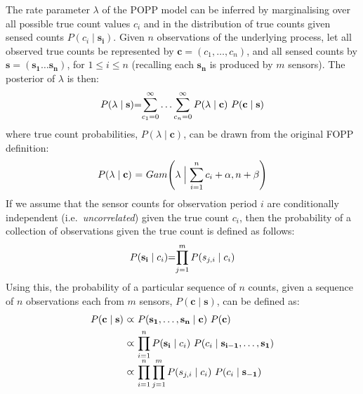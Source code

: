 The rate parameter $\lambda$ of the POPP model can be inferred by marginalising over all possible true count values $c_i$ and in the  distribution of true counts given sensed counts $P(c_i \mid \mathbf{s_i})$.
% 
Given $n$ observations of the underlying process, let all observed true counts be represented by $\mathbf{c} = (c_1, \ldots, c_n)$, and all sensed counts by $\mathbf{s}=(\mathbf{s_1} \dots \mathbf{s_n})$, for $1 \leq i \leq n$ (recalling each $\mathbf{s_n}$ is produced by $m$ sensors). 
% 
The posterior of $\lambda$ is then:
\begin{equation}
	\label{eq:marginal_occurrences}
	\begin{tabular}{r@{=}l}
		$P(\lambda \mid \mathbf{s})$ &  $\displaystyle\sum_{c_1=0}^{\infty} \ldots \displaystyle\sum_{c_n=0}^{\infty} P(\lambda \mid \mathbf{c}) ~ P(\mathbf{c} \mid \mathbf{s})$ \\
	\end{tabular}
\end{equation}
\noindent where true count probabilities, $P(\lambda \mid \mathbf{c})$, can be drawn from the original FOPP definition:
\begin{equation}
	\label{eq:gamma_posterior_fopp}
	\begin{tabular}{r@{ = }l}
		$P(\lambda \mid \mathbf{c})$ & $Gam\Bigg(\lambda \Bigm| \displaystyle\sum_{i=1}^{n} c_i + \alpha, n + \beta \Bigg)$
	\end{tabular}
\end{equation}
If we assume that the sensor counts for observation period $i$ are conditionally independent (i.e.~\textit{uncorrelated}) given the true count $c_i$, then the probability of a collection of observations given the true count is defined as follows: 
\begin{equation}
	\label{eq:independent_sensor_likelihood}
	\begin{tabular}{r@{=}l}
		$P(\mathbf{s_i} \mid c_i)$ & $\displaystyle\prod_{j=1}^{m} P(s_{j,i} \mid c_i)$ \\ 
	\end{tabular}
\end{equation}
Using this, the probability of a particular sequence of $n$ counts, given a sequence of $n$ observations each from $m$ sensors, $P(\mathbf{c} \mid \mathbf{s})$, can be defined as:
\begin{equation}
	\label{eq:occurrences_likelihood}
	\begin{tabular}{r@{ $\varpropto$ }l}
		$P(\mathbf{c} \mid \mathbf{s})$ & $P(\mathbf{s_1}, \ldots, \mathbf{s_n} \mid \mathbf{c}) ~ P(\mathbf{c})$ \\ [1ex]
		& $\displaystyle\prod_{i=1}^{n} P(\mathbf{s_i} \mid c_i) ~ P(c_i \mid \mathbf{s_{i-1}}, \ldots, \mathbf{s_{1}})$ \\ [2ex]
		& $\displaystyle\prod_{i=1}^{n} \displaystyle\prod_{j=1}^{m} P(s_{j,i} \mid c_i) ~ P(c_i \mid \mathbf{s_{-1}})$
	\end{tabular}
\end{equation}
